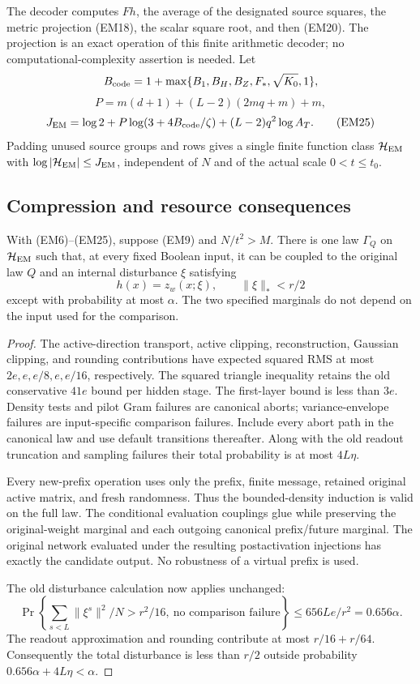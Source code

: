The decoder computes $Fh$, the average of the designated source squares,
the metric projection (EM18), the scalar square root, and then (EM20).
The projection is an exact operation of this finite arithmetic decoder;
no computational-complexity assertion is needed. Let
\[
 B_{\rm code}=1+\max\{B_1,B_H,B_Z,F_*,\sqrt{K_0},1\},
\]
\[
 P=m(d+1)+(L-2)(2mq+m)+m,
\]
\[
 J_{\rm EM}=\log2+P\log(3+4B_{\rm code}/\zeta)
                  +(L-2)q^2\log A_T.
 \tag{EM25}
\]
Padding unused source groups and rows gives a single finite function
class $\mathcal H_{\rm EM}$ with
$\log|\mathcal H_{\rm EM}|\le J_{\rm EM}$, independent of $N$ and of
the actual scale $0<t\le t_0$.

\subsection{Compression and resource consequences}

\begin{theorem}
\label{thm:em-compression}
With (EM6)--(EM25), suppose (EM9) and $N/t^2>M$. There is one law
$\Gamma_Q$ on $\mathcal H_{\rm EM}$ such that, at every fixed Boolean
input, it can be coupled to the original law $Q$ and an internal
disturbance $\xi$ satisfying
\[
 h(x)=z_w(x;\xi),\qquad \|\xi\|_*<r/2
\]
except with probability at most $\alpha$. The two specified marginals
do not depend on the input used for the comparison.
\end{theorem}
\begin{proof}
The active-direction transport, active clipping, reconstruction,
Gaussian clipping, and rounding contributions have expected squared
RMS at most $2e,e,e/8,e,e/16$, respectively. The squared triangle
inequality retains the old conservative $41e$ bound per hidden stage.
The first-layer bound is less than $3e$. Density tests and pilot Gram
failures are canonical aborts; variance-envelope failures are
input-specific comparison failures. Include every abort path in the
canonical law and use default transitions thereafter. Along with the
old readout truncation and sampling failures their total probability is
at most $4L\eta$.

Every new-prefix operation uses only the prefix, finite message,
retained original active matrix, and fresh randomness. Thus the
bounded-density induction is valid on the full law. The conditional
evaluation couplings glue while preserving the original-weight marginal
and each outgoing canonical prefix/future marginal. The original
network evaluated under the resulting postactivation injections has
exactly the candidate output. No robustness of a virtual prefix is used.

The old disturbance calculation now applies unchanged:
\[
 \Pr\left\{\sum_{s<L}\|\xi^s\|^2/N>r^2/16,
                         \ \text{no comparison failure}\right\}
 \le656Le/r^2=0.656\alpha.
\]
The readout approximation and rounding contribute at most
$r/16+r/64$. Consequently the total disturbance is less than $r/2$
outside probability $0.656\alpha+4L\eta<\alpha$.
\end{proof}

